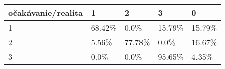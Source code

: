 \begin{table}[!h]
\begin{tabular}{|p{}|p{}|p{}|p{}|p{}|}
\hline
očakávanie/realita& 1& 2& 3& 0\\ \hline
1 & 68.42\% & 0.0\% & 15.79\% & 15.79\% \\ \hline
2 & 5.56\% & 77.78\% & 0.0\% & 16.67\% \\ \hline
3 & 0.0\% & 0.0\% & 95.65\% & 4.35\% \\ \hline
\end{tabular}
\end{table}
